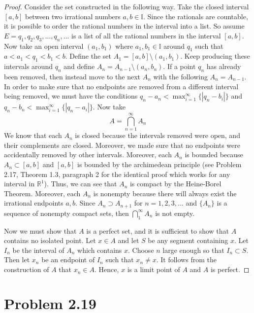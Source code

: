 \documentclass[psamsfonts]{amsart}
\theoremstyle{definition}
\theoremstyle{remark}
\numberwithin{equation}{section}
\begin{document}
\begin{proof}
Consider the set constructed in the following way. Take the closed interval $[a,b]$ between two irrational numbers $a,b \in \mathbb{I}$. Since the rationals are countable, it is possible to order the rational numbers in the interval into a list. So assume $E = {q_1, q_2, q_3, \ldots, q_n, \ldots}$ is a list of all the rational numbers in the interval $[a,b]$. Now take an open interval $(a_1,b_1)$ where $a_1, b_1 \in \mathbb{I}$ around $q_1$ such that $a < a_1 < q_1 < b_1 < b$. Define the set $A_1 = [a,b] \setminus (a_1,b_1)$. Keep producing these intervals around $q_n$ and define $A_n = A_{n-1} \setminus (a_n, b_n)$. If a point $q_n$ has already been removed, then instead move to the next $A_n$ with the following $A_n = A_{n-1}$. In order to make sure that no endpoints are removed from a different interval being removed, we must have the conditions $q_n - a_n < \max_{i=1}^\infty \{ |q_n - b_i| \}$ and $q_n - b_n < \max_{i=1}^\infty \{ |q_n - a_i | \}$. Now take 
\begin{equation}
A = \bigcap_{n=1}^\infty A_n
\end{equation}
We know that each $A_n$ is closed because the intervals removed were open, and their complements are closed. Moreover, we made sure that no endpoints were accidentally removed by other intervals. Moreover, each $A_n$ is bounded because $A_n \subset [a,b]$ and $[a,b]$ is bounded by the archimedean principle (see Problem 2.17, Theorem 1.3, paragraph 2 for the identical proof which works for any interval in $\mathbb{R}^1$). Thus, we can see that $A_n$ is compact by the Heine-Borel Theorem. Moreover, each $A_n$ is nonempty because there will always exist the irrational endpoints $a,b$. Since $A_n \supset A_{n+1}$ for $n = 1,2,3,\ldots$ and $\{ A_n \}$ is a sequence of nonempty compact sets, then $\bigcap_1^\infty A_n$ is not empty. 

Now we must show that $A$ is a perfect set, and it is sufficient to show that $A$ contains no isolated point. Let $x \in A$ and let $S$ be any segment containing $x$. Let $I_n$ be the interval of $A_n$ which contains $x$. Choose $n$ large enough so that $I_n \subset S$. Then let $x_n$ be an endpoint of $I_n$ such that $x_n \neq x$. It follows from the construction of $A$ that $x_n \in A$. Hence, $x$ is a limit point of $A$ and $A$ is perfect.
\end{proof}

\section{Problem 2.19}
\end{document}

